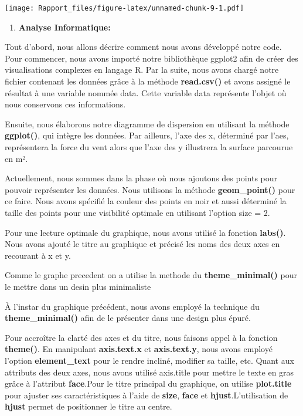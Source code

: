 \documentclass[
]{article}
\providecommand{\tightlist}{%
  \setlength{\itemsep}{0pt}\setlength{\parskip}{0pt}}
\begin{document}
\texttt{[image: Rapport\_files/figure-latex/unnamed-chunk-9-1.pdf]}

\begin{enumerate}
\def\labelenumi{\arabic{enumi}.}
\tightlist
\item
  \textbf{Analyse Informatique:}
\end{enumerate}

Tout d'abord, nous allons décrire comment nous avons développé notre
code. Pour commencer, nous avons importé notre bibliothèque ggplot2 afin
de créer des visualisations complexes en langage R. Par la suite, nous
avons chargé notre fichier contenant les données grâce à la méthode
\textbf{read.csv()} et avons assigné le résultat à une variable nommée
data. Cette variable data représente l'objet où nous conservons ces
informations.

Ensuite, nous élaborons notre diagramme de dispersion en utilisant la
méthode \textbf{ggplot()}, qui intègre les données. Par ailleurs, l'axe
des x, déterminé par l'aes, représentera la force du vent alors que
l'axe des y illustrera la surface parcourue en m².

Actuellement, nous sommes dans la phase où nous ajoutons des points pour
pouvoir représenter les données. Nous utilisons la méthode
\textbf{geom\_point()} pour ce faire. Nous avons spécifié la couleur des
points en noir et aussi déterminé la taille des points pour une
visibilité optimale en utilisant l'option size = 2.

Pour une lecture optimale du graphique, nous avons utilisé la fonction
\textbf{labs()}. Nous avons ajouté le titre au graphique et précisé les
noms des deux axes en recourant à x et y.

Comme le graphe precedent on a utilise la methode du
\textbf{theme\_minimal()} pour le mettre dans un desin plus minimaliste

À l'instar du graphique précédent, nous avons employé la technique du
\textbf{theme\_minimal()} afin de le présenter dans une design plus
épuré.

Pour accroître la clarté des axes et du titre, nous faisons appel à la
fonction \textbf{theme()}. En manipulant \textbf{axis.text.x} et
\textbf{axis.text.y}, nous avons employé l'option \textbf{element\_text}
pour le rendre incliné, modifier sa taille, etc. Quant aux attributs des
deux axes, nous avons utilisé axis.title pour mettre le texte en gras
grâce à l'attribut \textbf{face}.Pour le titre principal du graphique,
on utilise \textbf{plot.title} pour ajuster ses caractéristiques à
l'aide de \textbf{size}, \textbf{face} et \textbf{hjust}.L'utilisation
de \textbf{hjust} permet de positionner le titre au centre.
\end{document}
